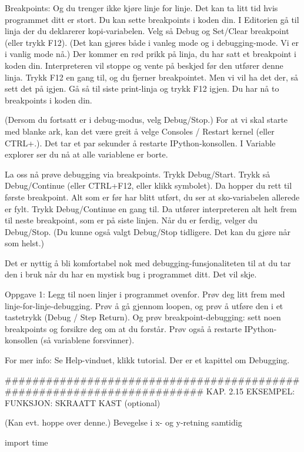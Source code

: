 Breakpoints: 
Og du trenger ikke kjøre linje for linje.
Det kan ta litt tid hvis programmet ditt er stort. 
Du kan sette breakpoints i koden din.
I Editorien gå til linja der du deklarerer kopi-variabelen.
Velg så Debug og Set/Clear breakpoint (eller trykk F12).
(Det kan gjøres både i vanleg mode og i debugging-mode. Vi er i vanlig mode nå.) 
Der kommer en rød prikk på linja, du har satt et breakpoint i koden din.
Interpreteren vil stoppe og vente på beskjed før den utfører denne linja. 
Trykk F12 en gang til, og du fjerner breakpointet.
Men vi vil ha det der, så sett det på igjen.
Gå så til siste print-linja og trykk F12 igjen.
Du har nå to breakpoints i koden din.

(Dersom du fortsatt er i debug-modus, velg Debug/Stop.)
For at vi skal starte med blanke ark, kan det være greit å velge
Consoles / Restart kernel (eller CTRL+.).
Det tar et par sekunder å restarte IPython-konsollen.
I Variable explorer ser du nå at alle variablene er borte.

La oss nå prøve debugging via breakpoints.
Trykk Debug/Start.
Trykk så Debug/Continue (eller CTRL+F12, eller klikk symbolet). 
Da hopper du rett til første breakpoint. 
Alt som er før har blitt utført, du ser at sko-variabelen allerede er fylt.
Trykk Debug/Continue en gang til.
Da utfører interpreteren alt helt frem til neste breakpoint, som er på siste linjen.
Når du er ferdig, velger du Debug/Stop.
(Du kunne også valgt Debug/Stop tidligere. Det kan du gjøre når som helst.) 


Det er nyttig å bli komfortabel nok med debugging-funsjonaliteten til at du
tar den i bruk når du har en mystisk bug i programmet ditt.
Det vil skje. 




Oppgave 1: Legg til noen linjer i programmet ovenfor.
Prøv deg litt frem med linje-for-linje-debugging. 
Prøv å gå gjennom loopen, og prøv å utføre den i et tastetrykk (Debug / Step Return). 
Og prøv breakpoint-debugging: sett noen breakpoints og forsikre deg om at du forstår. 
Prøv også å restarte IPython-konsollen (så variablene forsvinner). 


For mer info: Se Help-vinduet, klikk tutorial. Der er et kapittel om Debugging.

######################################################################## 
KAP. 2.15  EKSEMPEL: FUNKSJON: SKRAATT KAST  (optional)

(Kan evt. hoppe over denne.)
Bevegelse i x- og y-retning samtidig


import time

